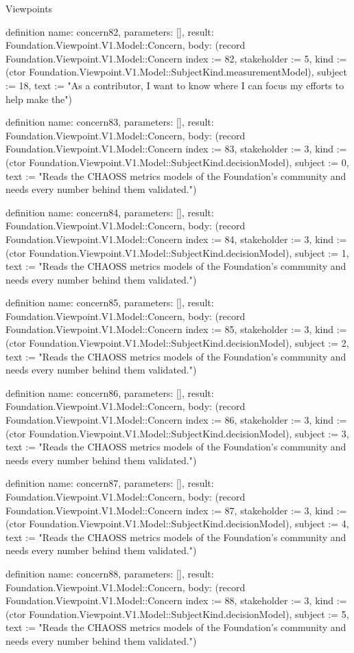 \begin{lexlean}{Viewpoints}
\begin{semanticmodule}
definition{
  name: concern82,
  parameters: [],
  result: Foundation.Viewpoint.V1.Model::Concern,
  body: (record Foundation.Viewpoint.V1.Model::Concern {index := 82, stakeholder := 5, kind := (ctor Foundation.Viewpoint.V1.Model::SubjectKind.measurementModel), subject := 18, text := "As a contributor, I want to know where I can focus my efforts to help make the"})
}

definition{
  name: concern83,
  parameters: [],
  result: Foundation.Viewpoint.V1.Model::Concern,
  body: (record Foundation.Viewpoint.V1.Model::Concern {index := 83, stakeholder := 3, kind := (ctor Foundation.Viewpoint.V1.Model::SubjectKind.decisionModel), subject := 0, text := "Reads the CHAOSS metrics models of the Foundation's community and needs every number behind them validated."})
}

definition{
  name: concern84,
  parameters: [],
  result: Foundation.Viewpoint.V1.Model::Concern,
  body: (record Foundation.Viewpoint.V1.Model::Concern {index := 84, stakeholder := 3, kind := (ctor Foundation.Viewpoint.V1.Model::SubjectKind.decisionModel), subject := 1, text := "Reads the CHAOSS metrics models of the Foundation's community and needs every number behind them validated."})
}

definition{
  name: concern85,
  parameters: [],
  result: Foundation.Viewpoint.V1.Model::Concern,
  body: (record Foundation.Viewpoint.V1.Model::Concern {index := 85, stakeholder := 3, kind := (ctor Foundation.Viewpoint.V1.Model::SubjectKind.decisionModel), subject := 2, text := "Reads the CHAOSS metrics models of the Foundation's community and needs every number behind them validated."})
}

definition{
  name: concern86,
  parameters: [],
  result: Foundation.Viewpoint.V1.Model::Concern,
  body: (record Foundation.Viewpoint.V1.Model::Concern {index := 86, stakeholder := 3, kind := (ctor Foundation.Viewpoint.V1.Model::SubjectKind.decisionModel), subject := 3, text := "Reads the CHAOSS metrics models of the Foundation's community and needs every number behind them validated."})
}

definition{
  name: concern87,
  parameters: [],
  result: Foundation.Viewpoint.V1.Model::Concern,
  body: (record Foundation.Viewpoint.V1.Model::Concern {index := 87, stakeholder := 3, kind := (ctor Foundation.Viewpoint.V1.Model::SubjectKind.decisionModel), subject := 4, text := "Reads the CHAOSS metrics models of the Foundation's community and needs every number behind them validated."})
}

definition{
  name: concern88,
  parameters: [],
  result: Foundation.Viewpoint.V1.Model::Concern,
  body: (record Foundation.Viewpoint.V1.Model::Concern {index := 88, stakeholder := 3, kind := (ctor Foundation.Viewpoint.V1.Model::SubjectKind.decisionModel), subject := 5, text := "Reads the CHAOSS metrics models of the Foundation's community and needs every number behind them validated."})
}


\end{semanticmodule}
\end{lexlean}
